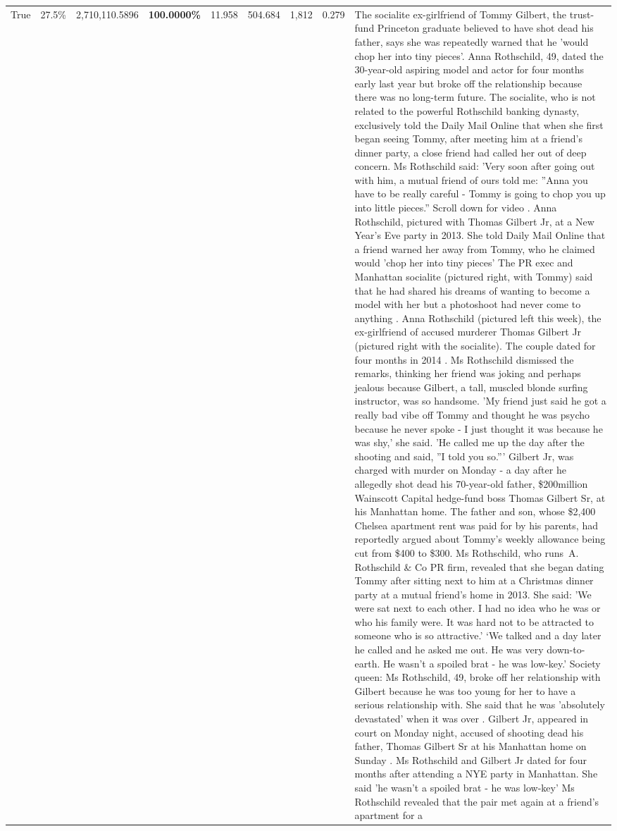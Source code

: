 \begin{table}[H]
\begin{tabular}{lllrlllll}
True & 27.5\% & 2,710,110.5896 & \bfseries \color{red} 100.0000\% & 11.958 & 504.684 & 1,812 & 0.279 & The socialite ex-girlfriend of Tommy Gilbert, the trust-fund Princeton graduate believed to have shot dead his father, says she was repeatedly warned that he 'would chop her into tiny pieces'. Anna Rothschild, 49, dated the 30-year-old aspiring model and actor for four months early last year but broke off the relationship because there was no long-term future. The socialite, who is not related to the powerful Rothschild banking dynasty, exclusively told the Daily Mail Online that when she first began seeing Tommy, after meeting him at a friend's dinner party, a close friend had called her out of deep concern. Ms Rothschild said: 'Very soon after going out with him, a mutual friend of ours told me: ''Anna you have to be really careful - Tommy is going to chop you up into little pieces.'' Scroll down for video . Anna Rothschild, pictured with Thomas Gilbert Jr, at a New Year's Eve party in 2013. She told Daily Mail Online that a friend warned her away from Tommy, who he claimed would 'chop her into tiny pieces' The PR exec and Manhattan socialite (pictured right, with Tommy) said that he had shared his dreams of wanting to become a model with her but a photoshoot had never come to anything . Anna Rothschild (pictured left this week), the ex-girlfriend of accused murderer Thomas Gilbert Jr (pictured right with the socialite). The couple dated for four months in 2014 . Ms Rothschild dismissed the remarks, thinking her friend was joking and perhaps jealous because Gilbert, a tall, muscled blonde surfing instructor, was so handsome. 'My friend just said he got a really bad vibe off Tommy and thought he was psycho because he never spoke - I just thought it was because he was shy,' she said. 'He called me up the day after the shooting and said, ''I told you so.''' Gilbert Jr, was charged with murder on Monday - a day after he allegedly shot dead his 70-year-old father, \$200million Wainscott Capital hedge-fund boss Thomas Gilbert Sr, at his Manhattan home. The father and son, whose \$2,400 Chelsea apartment rent was paid for by his parents, had reportedly argued about Tommy's weekly allowance being cut from \$400 to \$300. Ms Rothschild, who runs A. Rothschild \& Co PR firm, revealed that she began dating Tommy after sitting next to him at a Christmas dinner party at a mutual friend's home in 2013. She said: 'We were sat next to each other. I had no idea who he was or who his family were. It was hard not to be attracted to someone who is so attractive.' ‘We talked and a day later he called and he asked me out. He was very down-to-earth. He wasn’t a spoiled brat - he was low-key.’ Society queen: Ms Rothschild, 49, broke off her relationship with Gilbert because he was too young for her to have a serious relationship with. She said that he was 'absolutely devastated' when it was over . Gilbert Jr, appeared in court on Monday night, accused of shooting dead his father, Thomas Gilbert Sr at his Manhattan home on Sunday . Ms Rothschild and Gilbert Jr dated for four months after attending a NYE party in Manhattan. She said 'he wasn't a spoiled brat - he was low-key' Ms Rothschild revealed that the pair met again at a friend’s apartment for a 
\end{tabular}
\end{table}
